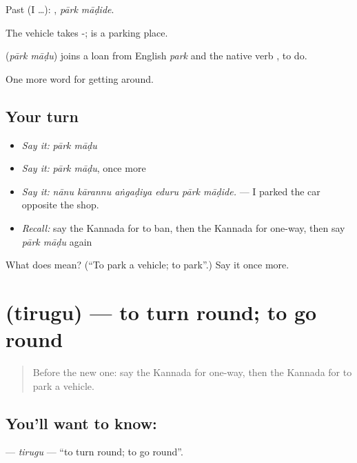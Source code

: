 Past (I …):  , \emph{pārk māḍide}.

The vehicle takes -;  is a parking place.

\begin{cousinweb}
\textbf{ } (\emph{pārk māḍu}) joins a loan from English \emph{park} and the native verb , to do.
\end{cousinweb}

\begin{grammarlens}[title={What you've built}]
One more word for getting around.
\end{grammarlens}

\subsection*{Your turn}
\begin{itemize}
\raggedright
  \item \emph{Say it:} \emph{pārk māḍu}
  \item \emph{Say it:} \emph{pārk māḍu}, once more
  \item \emph{Say it:} \emph{nānu kārannu aṅgaḍiya eduru pārk māḍide.} — I parked the car opposite the shop.
  \item \emph{Recall:} say the Kannada for to ban, then the Kannada for one-way, then say \emph{pārk māḍu} again
\end{itemize}

\begin{tcolorbox}[breakable,colback=teal!4,colframe=teal!35!black,title={Before you move on}]
What does   mean? (\textquotedblleft{}To park a vehicle; to park\textquotedblright{}.) Say it once more.
\end{tcolorbox}
\section[\texorpdfstring{\kn{ತಿರುಗು} (tirugu)}{ತಿರುಗು (tirugu)}]{ (tirugu) — to turn round; to go round}

\label{lesson:KA-C445-tirugu}



\begin{quote}
Before the new one: say the Kannada for one-way, then the Kannada for to park a vehicle.
\end{quote}

\subsection*{You'll want to know: }
\textbf{} — \emph{tirugu} — \textquotedblleft{}to turn round; to go round\textquotedblright{}.

